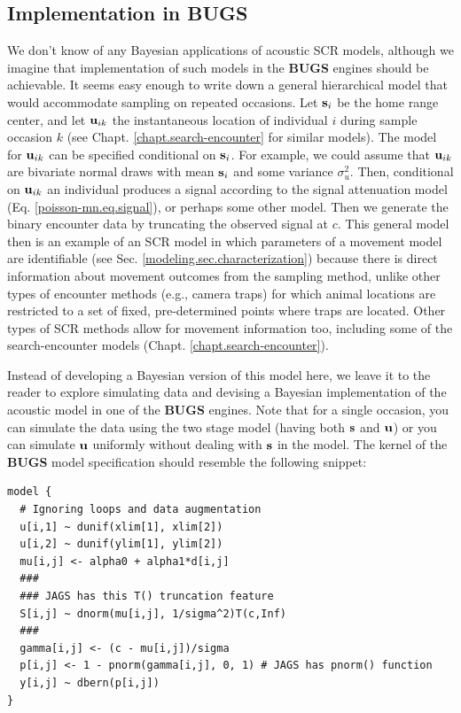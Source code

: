 \subsection{Implementation in {\bf BUGS}}
\label{acoustic.bugs}

We don't know of any Bayesian applications of acoustic SCR models,
although we imagine that implementation of such models in the {\bf
  BUGS} engines should be achievable.  It seems easy enough to write
down a general hierarchical model that would accommodate sampling on
repeated occasions. Let ${\bf s}_{i}$ be the home range center, and
let ${\bf u}_{ik}$ the instantaneous location of individual $i$ during
sample occasion $k$ (see Chapt. \ref{chapt.search-encounter} for
similar models). The model for ${\bf u}_{ik}$ can be specified
conditional on ${\bf s}_{i}$. For example, we could assume that ${\bf
  u}_{ik}$ are bivariate normal draws with mean ${\bf s}_{i}$ and some
variance $\sigma_{u}^{2}$. Then, conditional on ${\bf u}_{ik}$ an
individual produces a signal according to the signal attenuation model
(Eq. \ref{poisson-mn.eq.signal}), or perhaps some other model. Then we
generate the binary encounter data by truncating the observed signal
at $c$. This general model then is an example of an SCR model in which
parameters of a movement model are identifiable
(see Sec. \ref{modeling.sec.characterization})
 because
there is direct information about movement outcomes from the sampling
method, unlike other types of encounter methods (e.g., camera traps)
for which animal locations are restricted to a set of fixed, pre-determined
points where traps are located.  Other types of SCR methods allow for
movement information too, including some of the search-encounter
models (Chapt. \ref{chapt.search-encounter}).


Instead of developing a Bayesian version of this model here,
we leave it to the reader to
explore simulating data and devising a Bayesian implementation of the
acoustic model in one of the {\bf BUGS} engines.
Note that for a
single occasion, you can simulate the data using the two stage model
(having both ${\bf s}$ and ${\bf u}$) or you can simulate ${\bf u}$
uniformly without dealing with ${\bf s}$ in the model.
The kernel of the {\bf BUGS} model specification 
should resemble the following snippet:
{\small
\begin{verbatim}
model {
  # Ignoring loops and data augmentation
  u[i,1] ~ dunif(xlim[1], xlim[2])
  u[i,2] ~ dunif(ylim[1], ylim[2])
  mu[i,j] <- alpha0 + alpha1*d[i,j]
  ###
  ### JAGS has this T() truncation feature
  S[i,j] ~ dnorm(mu[i,j], 1/sigma^2)T(c,Inf) 
  ###
  gamma[i,j] <- (c - mu[i,j])/sigma
  p[i,j] <- 1 - pnorm(gamma[i,j], 0, 1) # JAGS has pnorm() function
  y[i,j] ~ dbern(p[i,j])
}
\end{verbatim}
}



